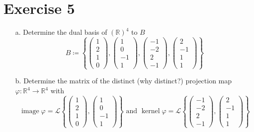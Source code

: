\documentclass[a4paper]{article}
\theoremstyle{definition}
\DeclareMathOperator\kernel{kernel}
\DeclareMathOperator\image{image}
\newcommand\set[1]{\left\{#1\right\}}
\begin{document}
\section{Exercise 5}
\begin{ex}
  \begin{enumerate}
    \item[a.] Determine the dual basis of $(\mathbb R)^4$ to $B$
    \[
      B \coloneqq \set{
        \begin{pmatrix} 1 \\ 2 \\ 1 \\ 0 \end{pmatrix},
        \begin{pmatrix} 1 \\ 0 \\ -1 \\ 1 \end{pmatrix},
        \begin{pmatrix} -1 \\ -2 \\ 2 \\ -1 \end{pmatrix},
        \begin{pmatrix} 2 \\ -1 \\ 1 \\ 1 \end{pmatrix}
      }
    \]

    \item[b.] Determine the matrix of the distinct (why distinct?) projection map
      $\varphi: \mathbb R^4 \to \mathbb R^4$ with
      \[
        \image{\varphi} = \mathcal L\set{\begin{pmatrix} 1 \\ 2 \\ 1 \\ 0 \end{pmatrix}, \begin{pmatrix} 1 \\ 0 \\ -1 \\ 1 \end{pmatrix}}
        \text{ and }
        \kernel{\varphi} = \mathcal L\set{\begin{pmatrix} -1 \\ -2 \\ 2 \\ -1 \end{pmatrix}, \begin{pmatrix} 2 \\ -1 \\ 1 \\ 1 \end{pmatrix}}
      \]
  \end{enumerate}
\end{ex}
\end{document}

